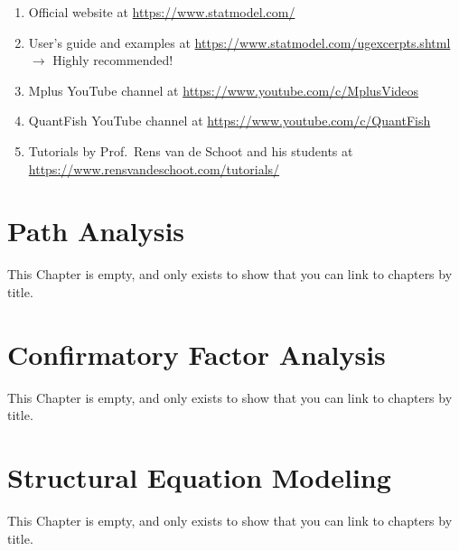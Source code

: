 \documentclass[
]{book}
\begin{document}
\begin{enumerate}
\def\labelenumi{\arabic{enumi}.}
\item
  Official website at \url{https://www.statmodel.com/}
\item
  User's guide and examples at \url{https://www.statmodel.com/ugexcerpts.shtml} \(\rightarrow\) Highly recommended!
\item
  Mplus YouTube channel at \url{https://www.youtube.com/c/MplusVideos}
\item
  QuantFish YouTube channel at \url{https://www.youtube.com/c/QuantFish}
\item
  Tutorials by Prof.~Rens van de Schoot and his students at \url{https://www.rensvandeschoot.com/tutorials/}
\end{enumerate}

\hypertarget{path-analysis}{%
\chapter{Path Analysis}\label{path-analysis}}

This Chapter is empty, and only exists to show that you can link to chapters by title.

\hypertarget{confirmatory-factor-analysis}{%
\chapter{Confirmatory Factor Analysis}\label{confirmatory-factor-analysis}}

This Chapter is empty, and only exists to show that you can link to chapters by title.

\hypertarget{structural-equation-modeling}{%
\chapter{Structural Equation Modeling}\label{structural-equation-modeling}}

This Chapter is empty, and only exists to show that you can link to chapters by title.

  
\end{document}
